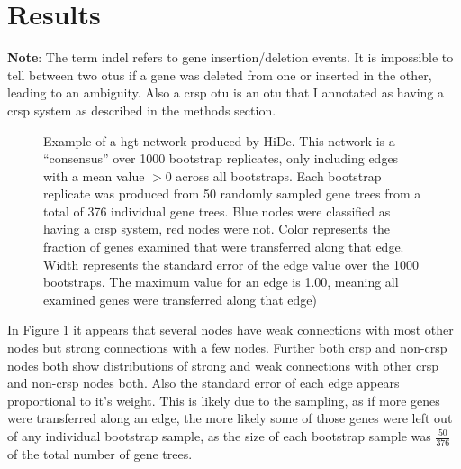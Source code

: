 \section{Results}
\textbf{Note}: The term indel refers to gene insertion/deletion events.
It is impossible to tell between two \ac{otu}s if a gene was deleted from one or inserted in the other, leading to an ambiguity.
Also a \ac{crsp} \ac{otu} is an \ac{otu} that I annotated as having a \ac{crsp} system as described in the methods section.
\FloatBarrier
\begin{figure}[htb!]
    \caption{Example of a \ac{hgt} network produced by HiDe.
             This network is a ``consensus'' over 1000 bootstrap replicates, only including edges with a mean value $> 0$ across all bootstraps.
             Each bootstrap replicate was produced from 50 randomly sampled gene trees from a total of 376 individual gene trees.
             Blue nodes were classified as having a \ac{crsp} system, red nodes were not.
             Color represents the fraction of genes examined that were transferred along that edge.
            Width represents the standard error of the edge value over the 1000 bootstraps.
            The maximum value for an edge is 1.00, meaning all examined genes were transferred along that edge)}
    \label{net}
\end{figure}
\FloatBarrier
In Figure \ref{net} it appears that several nodes have weak connections with most other nodes but strong connections with a few nodes.
Further both \ac{crsp} and non-\ac{crsp} nodes both show distributions of strong and weak connections with other \ac{crsp} and non-\ac{crsp} nodes both.
Also the standard error of each edge appears proportional to it's weight.
This is likely due to the sampling, as if more genes were transferred along an edge, the more likely some of those genes were left out of any individual bootstrap sample, as the size of each bootstrap sample was $\frac{50}{376}$ of the total number of gene trees.

